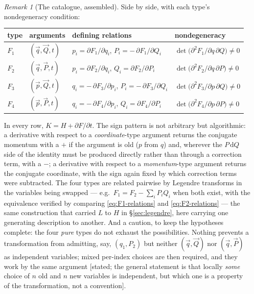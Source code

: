 \documentclass[11pt]{article}
\theoremstyle{plain}
\theoremstyle{definition}
\theoremstyle{remark}
\newtheorem{remark}[theorem]{Remark}
\newcommand{\dd}{\mathrm{d}}
\newcommand{\vq}{\vec{q}}
\newcommand{\vp}{\vec{p}}
\newcommand{\vQ}{\vec{Q}}
\newcommand{\vP}{\vec{P}}
\begin{document}
\begin{remark}[The catalogue, assembled]
\label{rem:four-types}
Side by side, with each type's nondegeneracy condition:
\begin{center}
\begin{tabular}{llll}
\toprule
type & arguments & defining relations & nondegeneracy \\
\midrule
$F_1$ & $(\vq, \vQ, t)$ &
$p_i = \partial F_1/\partial q_i$,\quad
$P_i = -\,\partial F_1/\partial Q_i$ &
$\det\bigl(\partial^2 F_1/\partial q\,\partial Q\bigr) \ne 0$ \\[2pt]
$F_2$ & $(\vq, \vP, t)$ &
$p_i = \partial F_2/\partial q_i$,\quad
$Q_i = \partial F_2/\partial P_i$ &
$\det\bigl(\partial^2 F_2/\partial q\,\partial P\bigr) \ne 0$ \\[2pt]
$F_3$ & $(\vp, \vQ, t)$ &
$q_i = -\,\partial F_3/\partial p_i$,\quad
$P_i = -\,\partial F_3/\partial Q_i$ &
$\det\bigl(\partial^2 F_3/\partial p\,\partial Q\bigr) \ne 0$ \\[2pt]
$F_4$ & $(\vp, \vP, t)$ &
$q_i = -\,\partial F_4/\partial p_i$,\quad
$Q_i = \partial F_4/\partial P_i$ &
$\det\bigl(\partial^2 F_4/\partial p\,\partial P\bigr) \ne 0$ \\
\bottomrule
\end{tabular}
\end{center}
In every row, $K = H + \partial F/\partial t$. The sign pattern is not
arbitrary but algorithmic: a derivative with respect to a
\emph{coordinate}-type argument returns the conjugate momentum with a
$+$ if the argument is old ($p$ from $q$) and, wherever the
$P\,\dd Q$ side of the identity must be produced directly rather than
through a correction term, with a $-$; a derivative with respect to a
\emph{momentum}-type argument returns the conjugate coordinate, with
the sign again fixed by which correction terms were subtracted. The
four types are related pairwise by Legendre transforms in the
variables being swapped --- e.g.\ $F_1 = F_2 - \sum_i P_i Q_i$ when
both exist, with the equivalence verified by comparing
\eqref{eq:F1-relations} and \eqref{eq:F2-relations} --- the same
construction that carried $L$ to $H$ in \S\ref{sec:legendre}, here
carrying one generating description to another. And a caution, to keep the
hypotheses complete: the four \emph{pure} types do not exhaust
the possibilities. Nothing prevents a transformation from admitting,
say, $(q_1, P_2)$ but neither $(\vq, \vQ)$ nor $(\vq, \vP)$ as
independent variables; mixed per-index choices are then required, and
they work by the same argument [stated; the general statement is that
locally \emph{some} choice of $n$ old and $n$ new variables is
independent, but which one is a property of the transformation, not a
convention].
\end{remark}
\end{document}

